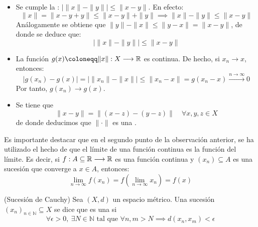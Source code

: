 \begin{observacion}
    \begin{itemize}
        \item     Se cumple la : $\big| \|x\| - \|y\| \big| \leq \|x - y\|$. En efecto:
        \begin{equation*}
            \|x\| = \|x - y + y\| \leq \|x - y\| + \|y\| \implies \|x\| - \|y\| \leq \|x - y\|
        \end{equation*}
        Análogamente se obtiene que $\|y\| - \|x\| \leq \|y - x\| = \|x - y\|$, de donde se deduce que:
        \begin{equation*}
            \big| \|x\| - \|y\| \big| \leq \|x - y\|
        \end{equation*}
        \item     La función $g(x) \coloneqq \|x\| : X \longrightarrow \R$ es continua. De hecho, si $x_n \to x$, entonces:
        \begin{equation*}
            |g(x_n) - g(x)| = \big| \|x_n\| - \|x\| \big| \leq \|x_n - x\| = g(x_n - x) \xrightarrow{n \to \infty} 0
        \end{equation*}
        Por tanto, $g(x_n) \to g(x)$.
        \item Se tiene que \begin{equation*}
            \| x-y\|=\| (x-z) - (y-z)\| \quad \forall x,y,z \in X 
        \end{equation*}
        de donde deducimos que $\|\cdot\|$ es una . \\
    \end{itemize}
\end{observacion}
\noindent
Es importante destacar que en el segundo punto de la observación anterior, se ha utilizado el hecho de que el límite de una función continua es la función del límite. Es decir, si $f : A \subseteq \mathbb{R} \longrightarrow \mathbb{R}$ es una función continua y $(x_n) \subseteq A$ es una sucesión que converge a $x \in A$, entonces:
\begin{equation*}
    \lim_{n \to \infty} f(x_n) = f\left( \lim_{n \to \infty} x_n \right) = f(x)
\end{equation*}

\begin{definicion}(Sucesión de Cauchy)
    Sea $(X, d)$ un espacio métrico. Una sucesión \mbox{$(x_n)_{n \in \mathbb{N}} \subseteq X$} se dice que es una  si
    $$\forall \epsilon > 0, \ \exists N \in \mathbb{N} \text{ tal que } \forall n, m > N \implies d(x_n, x_m) < \epsilon $$
\end{definicion}


